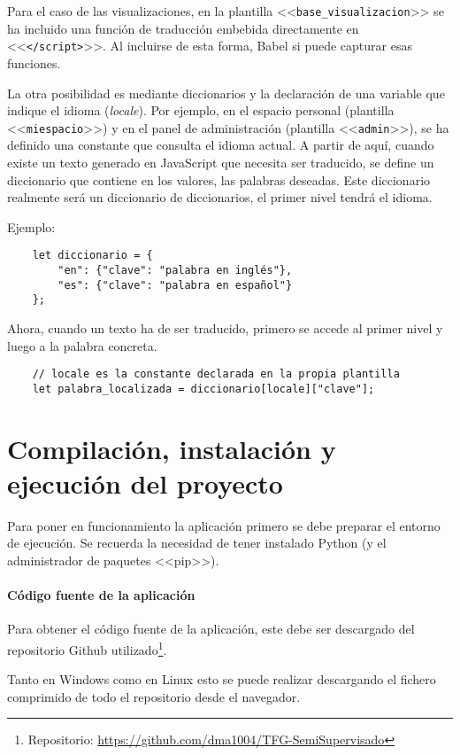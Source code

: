 Para el caso de las visualizaciones, en la plantilla
<<\texttt{base\_visualizacion}>> se ha incluido una función de traducción
embebida directamente en <<\texttt{</script>}>>. Al incluirse de esta forma,
Babel si puede capturar esas funciones. 

La otra posibilidad es mediante diccionarios y la declaración de una variable
que indique el idioma (\textit{locale}). Por ejemplo, en el espacio personal
(plantilla <<\texttt{miespacio}>>) y en el panel de administración (plantilla
<<\texttt{admin}>>), se ha definido una constante que consulta el idioma actual.
A partir de aquí, cuando existe un texto generado en JavaScript que necesita ser
traducido, se define un diccionario que contiene en los valores, las palabras
deseadas. Este diccionario realmente será un diccionario de diccionarios, el
primer nivel tendrá el idioma.

Ejemplo:

\begin{verbatim}
    let diccionario = {
        "en": {"clave": "palabra en inglés"},
        "es": {"clave": "palabra en español"}
    };
\end{verbatim}

Ahora, cuando un texto ha de ser traducido, primero se accede al primer nivel y
luego a la palabra concreta.


\begin{verbatim}
    // locale es la constante declarada en la propia plantilla
    let palabra_localizada = diccionario[locale]["clave"];
\end{verbatim}

\section{Compilación, instalación y ejecución del proyecto}

Para poner en funcionamiento la aplicación primero se debe preparar el entorno
de ejecución. Se recuerda la necesidad de tener instalado Python (y el
administrador de paquetes <<pip>>).

\paragraph{Código fuente de la aplicación} Para obtener el código fuente de la
aplicación, este debe ser descargado del repositorio Github utilizado\footnote{
Repositorio: \url{https://github.com/dma1004/TFG-SemiSupervisado}}.

Tanto en Windows como en Linux esto se puede realizar descargando el fichero
comprimido de todo el repositorio desde el navegador.

